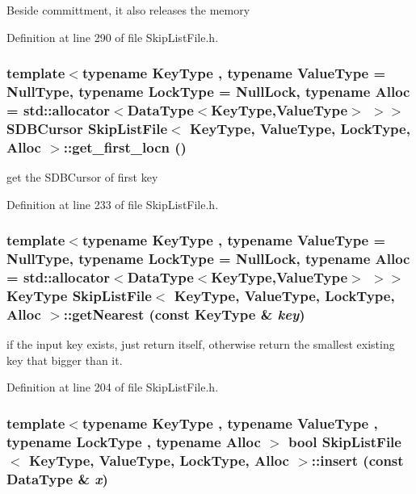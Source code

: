 Beside committment, it also releases the memory 

Definition at line 290 of file SkipListFile.h.\hypertarget{classSkipListFile_e1d5f4ce7d23b2f22768ed2b5e4efc78}{
\subsubsection[{get\_\-first\_\-locn}]{\setlength{\rightskip}{0pt plus 5cm}template$<$typename KeyType , typename ValueType  = NullType, typename LockType  = NullLock, typename Alloc  = std::allocator$<$DataType$<$KeyType,ValueType$>$ $>$$>$ {\bf SDBCursor} {\bf SkipListFile}$<$ KeyType, ValueType, LockType, Alloc $>$::get\_\-first\_\-locn ()}}
\label{classSkipListFile_e1d5f4ce7d23b2f22768ed2b5e4efc78}


get the SDBCursor of first key 

Definition at line 233 of file SkipListFile.h.\hypertarget{classSkipListFile_44473481714fc1218112bb1b45550883}{
\subsubsection[{getNearest}]{\setlength{\rightskip}{0pt plus 5cm}template$<$typename KeyType , typename ValueType  = NullType, typename LockType  = NullLock, typename Alloc  = std::allocator$<$DataType$<$KeyType,ValueType$>$ $>$$>$ KeyType {\bf SkipListFile}$<$ KeyType, ValueType, LockType, Alloc $>$::getNearest (const KeyType \& {\em key})}}
\label{classSkipListFile_44473481714fc1218112bb1b45550883}


if the input key exists, just return itself, otherwise return the smallest existing key that bigger than it. 

Definition at line 204 of file SkipListFile.h.\hypertarget{classSkipListFile_8a284db41397e361e0f520521d6c8c1e}{
\subsubsection[{insert}]{\setlength{\rightskip}{0pt plus 5cm}template$<$typename KeyType , typename ValueType , typename LockType , typename Alloc $>$ bool {\bf SkipListFile}$<$ KeyType, ValueType, LockType, Alloc $>$::insert (const DataType \& {\em x})}}
\label{classSkipListFile_8a284db41397e361e0f520521d6c8c1e}


